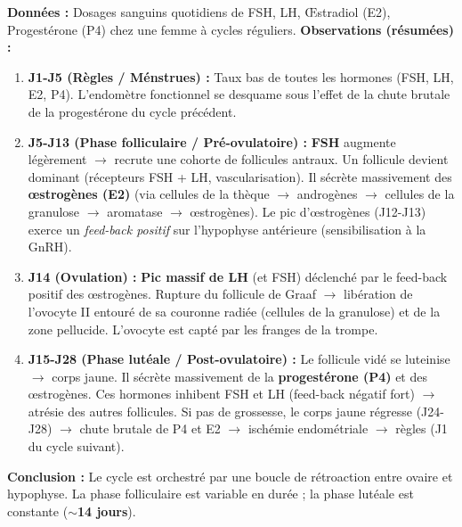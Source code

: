 \documentclass[11pt]{article}
\newcommand{\cle}[1]{{\popxbold\color{popdark}#1}}
\begin{document}
\begin{experience}
\textbf{Données :} Dosages sanguins quotidiens de FSH, LH, Œstradiol (E2), Progestérone (P4) chez une femme à cycles réguliers.
\textbf{Observations (résumées) :}
\begin{enumerate}
    \item \textbf{J1-J5 (Règles / Ménstrues) :} Taux bas de toutes les hormones (FSH, LH, E2, P4). L'endomètre fonctionnel se desquame sous l'effet de la chute brutale de la progestérone du cycle précédent.
    \item \textbf{J5-J13 (Phase folliculaire / Pré-ovulatoire) :} \textbf{FSH} augmente légèrement $\rightarrow$ recrute une cohorte de follicules antraux. Un follicule devient \cle{dominant} (récepteurs FSH + LH, vascularisation). Il sécrète massivement des \textbf{œstrogènes (E2)} (via cellules de la thèque $\rightarrow$ androgènes $\rightarrow$ cellules de la granulose $\rightarrow$ aromatase $\rightarrow$ œstrogènes). Le pic d'œstrogènes (J12-J13) exerce un \emph{feed-back positif} sur l'hypophyse antérieure (sensibilisation à la GnRH).
    \item \textbf{J14 (Ovulation) :} \textbf{Pic massif de LH} (et FSH) déclenché par le feed-back positif des œstrogènes. Rupture du follicule de Graaf $\rightarrow$ libération de l'ovocyte II entouré de sa couronne radiée (cellules de la granulose) et de la zone pellucide. L'ovocyte est capté par les franges de la trompe.
    \item \textbf{J15-J28 (Phase lutéale / Post-ovulatoire) :} Le follicule vidé se luteinise $\rightarrow$ \cle{corps jaune}. Il sécrète massivement de la \textbf{progestérone (P4)} et des œstrogènes. Ces hormones inhibent FSH et LH (feed-back négatif fort) $\rightarrow$ atrésie des autres follicules. Si pas de grossesse, le corps jaune régresse (J24-J28) $\rightarrow$ chute brutale de P4 et E2 $\rightarrow$ ischémie endométriale $\rightarrow$ règles (J1 du cycle suivant).
\end{enumerate}
\textbf{Conclusion :} Le cycle est orchestré par une boucle de rétroaction entre ovaire et hypophyse. La phase folliculaire est variable en durée ; la phase lutéale est constante (\textbf{$\sim$14 jours}).
\end{experience}
\end{document}
